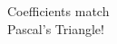 \documentclass[preview]{standalone}
\begin{document}
\begin{center}
Coefficients match\\Pascal's Triangle!
\end{center}
\end{document}
